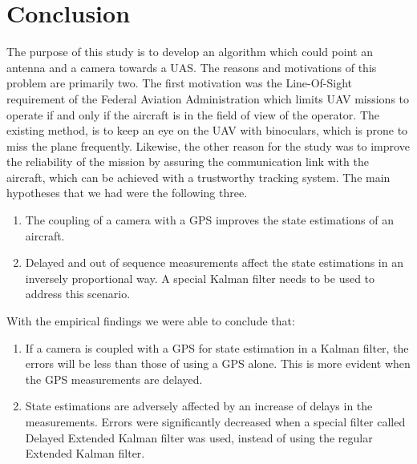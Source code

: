 \chapter{Conclusion}
\label{ch:conclusion}




The purpose of this study is to develop an algorithm which could point an antenna and a camera towards a UAS. The reasons and motivations of this problem are primarily two. The first motivation was the Line-Of-Sight requirement of the Federal Aviation Administration which limits UAV missions to operate if and only if the aircraft is in the field of view of the operator. The existing method, is to keep an eye on the UAV with binoculars, which is prone to miss the plane frequently. Likewise, the other reason for the study was to improve the reliability of the mission by assuring the communication link with the aircraft, which can be achieved with a trustworthy tracking system. \linebreak
\linebreak
The main hypotheses that we had were the following three.
\begin{enumerate}
\item The coupling of a camera with a GPS improves the state estimations of an aircraft.
\item Delayed and out of sequence measurements affect the state estimations in an inversely proportional way. A special Kalman filter needs to be used to address this scenario.
\end{enumerate}
With the empirical findings we were able to conclude that:
\begin{enumerate}
\item If a camera is coupled with a GPS for state estimation in a Kalman filter, the errors will be less than those of using a GPS alone. This is more evident when the GPS measurements are delayed.
\item State estimations are adversely affected by an increase of delays in the measurements. Errors were significantly decreased when a special filter called Delayed Extended Kalman filter was used, instead of using the regular Extended Kalman filter.
\end{enumerate}
\pagebreak

